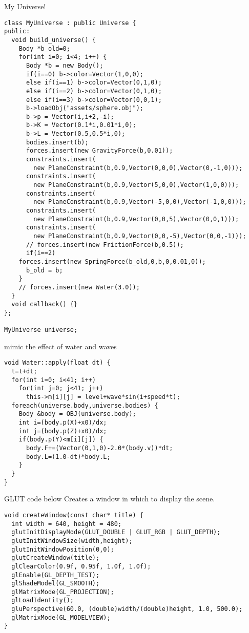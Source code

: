 My Universe!
\begin{lstlisting}
class MyUniverse : public Universe {
public:
  void build_universe() {
    Body *b_old=0;
    for(int i=0; i<4; i++) {
      Body *b = new Body();
      if(i==0) b->color=Vector(1,0,0);
      else if(i==1) b->color=Vector(0,1,0);
      else if(i==2) b->color=Vector(0,1,0);
      else if(i==3) b->color=Vector(0,0,1);
      b->loadObj("assets/sphere.obj");
      b->p = Vector(i,i+2,-i);
      b->K = Vector(0.1*i,0.01*i,0);
      b->L = Vector(0.5,0.5*i,0);
      bodies.insert(b);
      forces.insert(new GravityForce(b,0.01));
      constraints.insert(
        new PlaneConstraint(b,0.9,Vector(0,0,0),Vector(0,-1,0)));
      constraints.insert(
        new PlaneConstraint(b,0.9,Vector(5,0,0),Vector(1,0,0)));
      constraints.insert(
        new PlaneConstraint(b,0.9,Vector(-5,0,0),Vector(-1,0,0)));
      constraints.insert(
        new PlaneConstraint(b,0.9,Vector(0,0,5),Vector(0,0,1)));
      constraints.insert(
        new PlaneConstraint(b,0.9,Vector(0,0,-5),Vector(0,0,-1)));
      // forces.insert(new FrictionForce(b,0.5));
      if(i==2)
	forces.insert(new SpringForce(b_old,0,b,0,0.01,0));
      b_old = b;
    }
    // forces.insert(new Water(3.0));
  }
  void callback() {}
};

MyUniverse universe;
\end{lstlisting}

mimic the effect of water and waves
\begin{lstlisting}
void Water::apply(float dt) {
  t=t+dt;
  for(int i=0; i<41; i++)
    for(int j=0; j<41; j++)
      this->m[i][j] = level+wave*sin(i+speed*t);
  foreach(universe.body,universe.bodies) {
    Body &body = OBJ(universe.body);
    int i=(body.p(X)+x0)/dx;
    int j=(body.p(Z)+x0)/dx;
    if(body.p(Y)<m[i][j]) {
      body.F+=(Vector(0,1,0)-2.0*(body.v))*dt;    
      body.L=(1.0-dt)*body.L;
    }
  }
}
\end{lstlisting}

GLUT code below
Creates a window in which to display the scene.
\begin{lstlisting}
void createWindow(const char* title) {
  int width = 640, height = 480;
  glutInitDisplayMode(GLUT_DOUBLE | GLUT_RGB | GLUT_DEPTH);
  glutInitWindowSize(width,height);
  glutInitWindowPosition(0,0);
  glutCreateWindow(title);
  glClearColor(0.9f, 0.95f, 1.0f, 1.0f);
  glEnable(GL_DEPTH_TEST);
  glShadeModel(GL_SMOOTH);  
  glMatrixMode(GL_PROJECTION);
  glLoadIdentity();
  gluPerspective(60.0, (double)width/(double)height, 1.0, 500.0);
  glMatrixMode(GL_MODELVIEW);
}
\end{lstlisting}

